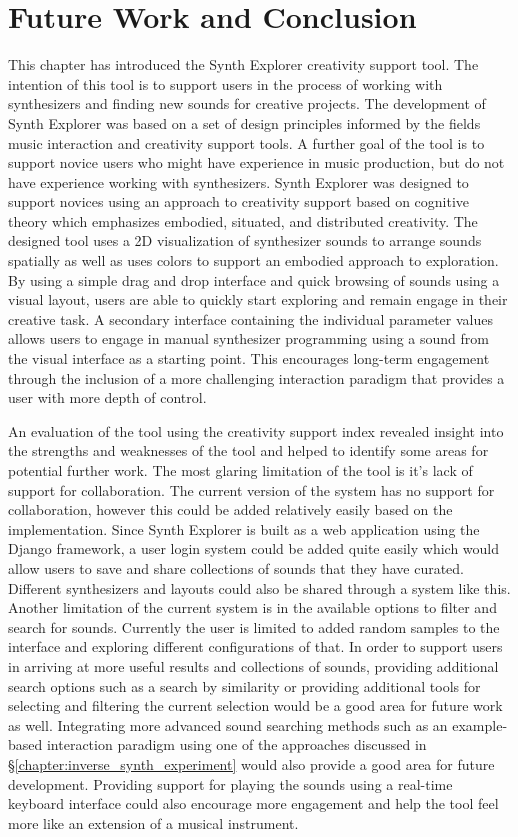 \section{Future Work and Conclusion}
This chapter has introduced the Synth Explorer creativity support tool. The intention of this tool is to support users in the process of working with synthesizers and finding new sounds for creative projects. The development of Synth Explorer was based on a set of design principles informed by the fields music interaction and creativity support tools. A further goal of the tool is to support novice users who might have experience in music production, but do not have experience working with synthesizers. Synth Explorer was designed to support novices using an approach to creativity support based on cognitive theory which emphasizes embodied, situated, and distributed creativity. The designed tool uses a 2D visualization of synthesizer sounds to arrange sounds spatially as well as uses colors to support an embodied approach to exploration. By using a simple drag and drop interface and quick browsing of sounds using a visual layout, users are able to quickly start exploring and remain engage in their creative task. A secondary interface containing the individual parameter values allows users to engage in manual synthesizer programming using a sound from the visual interface as a starting point. This encourages long-term engagement through the inclusion of a more challenging interaction paradigm that provides a user with more depth of control.

An evaluation of the tool using the creativity support index revealed insight into the strengths and weaknesses of the tool and helped to identify some areas for potential further work. The most glaring limitation of the tool is it's lack of support for collaboration. The current version of the system has no support for collaboration, however this could be added relatively easily based on the implementation. Since Synth Explorer is built as a web application using the Django framework, a user login system could be added quite easily which would allow users to save and share collections of sounds that they have curated. Different synthesizers and layouts could also be shared through a system like this. Another limitation of the current system is in the available options to filter and search for sounds. Currently the user is limited to added random samples to the interface and exploring different configurations of that. In order to support users in arriving at more useful results and collections of sounds, providing additional search options such as a search by similarity or providing additional tools for selecting and filtering the current selection would be a good area for future work as well. Integrating more advanced sound searching methods such as an example-based interaction paradigm using one of the approaches discussed in \S\ref{chapter:inverse_synth_experiment} would also provide a good area for future development. Providing support for playing the sounds using a real-time keyboard interface could also encourage more engagement and help the tool feel more like an extension of a musical instrument.